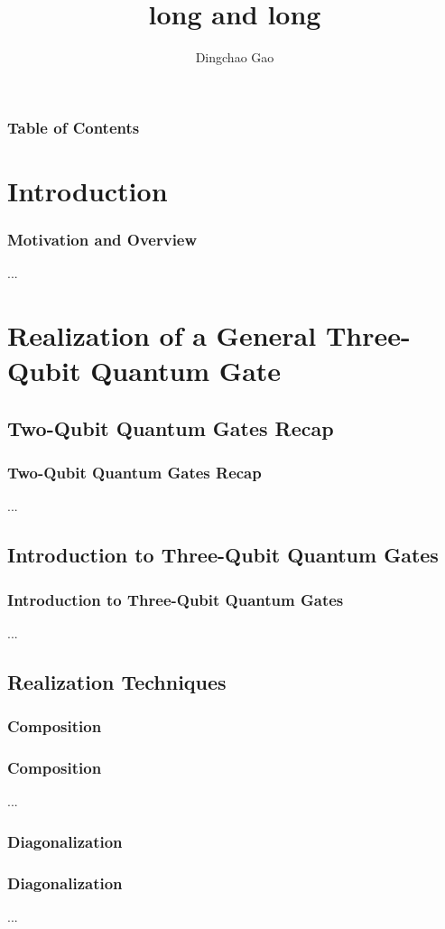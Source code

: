 \documentclass[aspectratio=1610]{beamer}
\title[]{long and long}
\author[Gcc]{Dingchao Gao}
\institute[ISCAS]{Institute of Software Chinese Academy of Sciences}
\begin{document}
\frame{\titlepage}

\begin{frame}
\frametitle{Table of Contents}
\tableofcontents[hideallsubsections]
\end{frame}

\section{Introduction}
\begin{frame}
\frametitle{Motivation and Overview}
...
\end{frame}

\section{Realization of a General Three-Qubit Quantum Gate}
\subsection{Two-Qubit Quantum Gates Recap}
\begin{frame}
\frametitle{Two-Qubit Quantum Gates Recap}
...
\end{frame}

\subsection{Introduction to Three-Qubit Quantum Gates}
\begin{frame}
\frametitle{Introduction to Three-Qubit Quantum Gates}
...
\end{frame}

\subsection{Realization Techniques}
\subsubsection{Composition}
\begin{frame}
\frametitle{Composition}
...
\end{frame}

\subsubsection{Diagonalization}
\begin{frame}
\frametitle{Diagonalization}
...
\end{frame}
\end{document}
